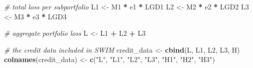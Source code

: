 \documentclass[
]{article}
\newenvironment{Shaded}{\begin{snugshade}}{\end{snugshade}}
\newcommand{\CommentTok}[1]{\textcolor[rgb]{0.56,0.35,0.01}{\textit{#1}}}
\newcommand{\KeywordTok}[1]{\textcolor[rgb]{0.13,0.29,0.53}{\textbf{#1}}}
\newcommand{\NormalTok}[1]{#1}
\newcommand{\OperatorTok}[1]{\textcolor[rgb]{0.81,0.36,0.00}{\textbf{#1}}}
\newcommand{\StringTok}[1]{\textcolor[rgb]{0.31,0.60,0.02}{#1}}
\begin{document}
\begin{Shaded}
\begin{Highlighting}[]
\CommentTok{\# total loss per subportfolio}
\NormalTok{  L1 \textless{}{-}}\StringTok{ }\NormalTok{M1 }\OperatorTok{*}\StringTok{ }\NormalTok{e1 }\OperatorTok{*}\StringTok{ }\NormalTok{LGD1}
\NormalTok{  L2 \textless{}{-}}\StringTok{ }\NormalTok{M2 }\OperatorTok{*}\StringTok{ }\NormalTok{e2 }\OperatorTok{*}\StringTok{ }\NormalTok{LGD2}
\NormalTok{  L3 \textless{}{-}}\StringTok{ }\NormalTok{M3 }\OperatorTok{*}\StringTok{ }\NormalTok{e3 }\OperatorTok{*}\StringTok{ }\NormalTok{LGD3}
  
\CommentTok{\# aggregate portfolio loss}
\NormalTok{  L \textless{}{-}}\StringTok{ }\NormalTok{L1 }\OperatorTok{+}\StringTok{ }\NormalTok{L2 }\OperatorTok{+}\StringTok{ }\NormalTok{L3}
  
\CommentTok{\# the credit data included in SWIM}
\NormalTok{  credit\_data \textless{}{-}}\StringTok{ }\KeywordTok{cbind}\NormalTok{(L, L1, L2, L3, H)}
  \KeywordTok{colnames}\NormalTok{(credit\_data) \textless{}{-}}\StringTok{ }\KeywordTok{c}\NormalTok{(}\StringTok{"L"}\NormalTok{, }\StringTok{"L1"}\NormalTok{, }\StringTok{"L2"}\NormalTok{, }\StringTok{"L3"}\NormalTok{, }\StringTok{"H1"}\NormalTok{, }\StringTok{"H2"}\NormalTok{, }\StringTok{"H3"}\NormalTok{)}
\end{Highlighting}
\end{Shaded}


  
\end{document}
